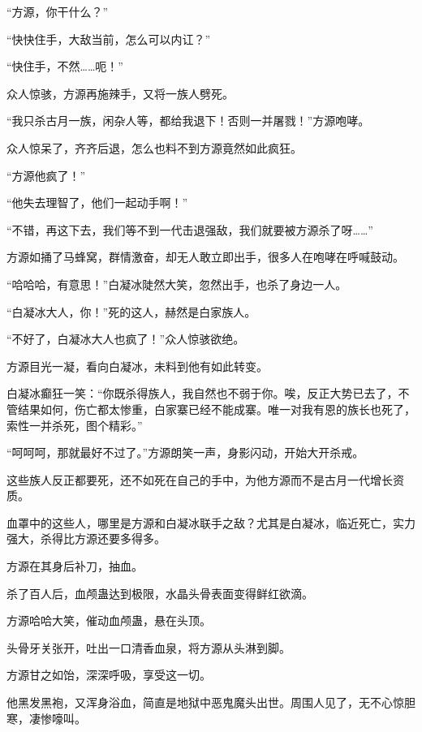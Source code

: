 
\begin{this_body}

“方源，你干什么？”

“快快住手，大敌当前，怎么可以内讧？”

“快住手，不然……呃！”

众人惊骇，方源再施辣手，又将一族人劈死。

“我只杀古月一族，闲杂人等，都给我退下！否则一并屠戮！”方源咆哮。

众人惊呆了，齐齐后退，怎么也料不到方源竟然如此疯狂。

“方源他疯了！”

“他失去理智了，他们一起动手啊！”

“不错，再这下去，我们等不到一代击退强敌，我们就要被方源杀了呀……”

方源如捅了马蜂窝，群情激奋，却无人敢立即出手，很多人在咆哮在呼喊鼓动。

“哈哈哈，有意思！”白凝冰陡然大笑，忽然出手，也杀了身边一人。

“白凝冰大人，你！”死的这人，赫然是白家族人。

“不好了，白凝冰大人也疯了！”众人惊骇欲绝。

方源目光一凝，看向白凝冰，未料到他有如此转变。

白凝冰癫狂一笑：“你既杀得族人，我自然也不弱于你。唉，反正大势已去了，不管结果如何，伤亡都太惨重，白家寨已经不能成寨。唯一对我有恩的族长也死了，索性一并杀死，图个精彩。”

“呵呵呵，那就最好不过了。”方源朗笑一声，身影闪动，开始大开杀戒。

这些族人反正都要死，还不如死在自己的手中，为他方源而不是古月一代增长资质。

血罩中的这些人，哪里是方源和白凝冰联手之敌？尤其是白凝冰，临近死亡，实力强大，杀得比方源还要多得多。

方源在其身后补刀，抽血。

杀了百人后，血颅蛊达到极限，水晶头骨表面变得鲜红欲滴。

方源哈哈大笑，催动血颅蛊，悬在头顶。

头骨牙关张开，吐出一口清香血泉，将方源从头淋到脚。

方源甘之如饴，深深呼吸，享受这一切。

他黑发黑袍，又浑身浴血，简直是地狱中恶鬼魔头出世。周围人见了，无不心惊胆寒，凄惨嚎叫。


\end{this_body}

